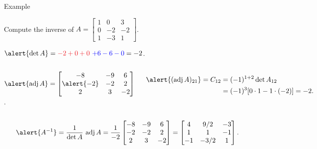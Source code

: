 \documentclass[xcolor=dvipsnames,aspectratio=169,t]{beamer}
\begin{document}
\begin{frame}{Example}
  \medskip
  
  Compute the inverse of
  $A=\begin{bmatrix} 1 & 0 & 3 \\ 0 & -2 & -2\\ 1 & -3 & 1 \end{bmatrix}$.
  \bigskip
  
  \pause
  $\alert{\det A} = \red{-2 + 0 + 0} \ \blue{+6 -6 -0} = -2$.
  \bigskip
  
  \begin{columns}
  \pause
  $\alert{\adj A} = 
    \begin{bmatrix} -8 & -9 & 6 \\ \alert{-2} & -2 & 2 \\ 2 & 3 & -2 \end{bmatrix}
  $.
  
  \pause\vspace*{-1em}
  \begin{align*}
      \alert{(\adj A)_{21}} = C_{12} &= (-1)^{1+2} \det A_{12} \\ 
                                     &= (-1)^3 [0\cdot 1 - 1\cdot (-2)] = -2.
  \end{align*}
  \end{columns}
  \vspace*{2.5em}
  
  \[
    \alert{A^{-1}} = \frac{1}{\det A} \ \adj A 
    = \frac{1}{-2} \begin{bmatrix} -8 & -9 & 6 \\ -2 & -2 & 2 \\ 2 & 3 & -2 \end{bmatrix}
    = \begin{bmatrix} 4 & 9/2 & -3 \\ 1 & 1 & -1 \\ -1 & -3/2 & 1 \end{bmatrix}.
  \]
\end{frame}


\begin{frame}{}
\vspace*{7em}

\begin{center}
{\Huge {}}
\end{center}
\end{frame}
\end{document}
